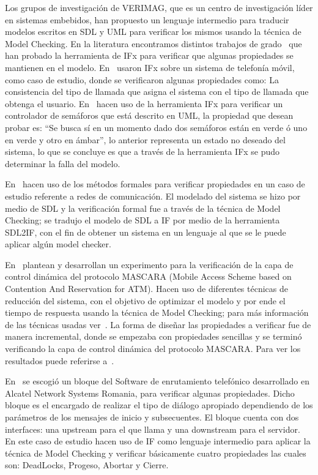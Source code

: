 Los grupos de investigaci\'on de VERIMAG, que es un centro de investigaci\'on l\'ider en sistemas embebidos, han propuesto un lenguaje intermedio para traducir modelos escritos en SDL y UML para verificar los mismos usando la t\'ecnica de Model Checking. En la literatura encontramos distintos trabajos de grado~\cite{BravoParra2006, Perez2006} que han probado la herramienta de IFx para verificar que algunas propiedades se mantienen en el modelo. En~\cite{BravoParra2006} usaron IFx sobre un sistema de telefon\'ia m\'ovil, como caso de estudio, donde se verificaron algunas propiedades como: La consistencia del tipo de llamada que asigna el sistema con el tipo de llamada que obtenga el usuario. En~\cite{Perez2006} hacen uso de la herramienta IFx para verificar un controlador de sem\'aforos que est\'a descrito en UML, la propiedad que desean probar es: “Se busca s\'i en un momento dado dos sem\'aforos est\'an en verde \'o uno en verde y otro en \'ambar”, lo anterior representa un  estado no deseado del sistema, lo que se concluye es que a trav\'es de la herramienta IFx se pudo determinar la falla del modelo.

En~\cite{Vaovic2005} hacen uso de los m\'etodos formales para verificar propiedades en un caso de estudio referente a redes de comunicaci\'on. El modelado del sistema se hizo por medio de SDL y la verificaci\'on formal fue a trav\'es de la t\'ecnica de Model Checking; se tradujo el modelo de SDL a IF por medio de la herramienta SDL2IF, con el fin de obtener un sistema en un lenguaje al que se le puede aplicar alg\'un model checker. 

En~\cite{Jia2001} plantean y desarrollan un experimento para la verificaci\'on de la capa de control din\'amica del protocolo MASCARA (Mobile Access Scheme based on Contention And Reservation for ATM). Hacen uso de diferentes t\'ecnicas de reducci\'on del sistema, con el objetivo de optimizar el modelo y por ende el tiempo de respuesta usando la t\'ecnica  de Model Checking; para m\'as informaci\'on de las t\'ecnicas usadas ver~\cite{Jia2001}. La forma de diseñar las propiedades a verificar fue de manera incremental, donde se empezaba con propiedades sencillas y se termin\'o verificando la capa de control din\'amica del protocolo MASCARA. Para ver los resultados puede referirse a~\cite{Jia2001}.

En~\cite{MariusMinea} se escogi\'o un bloque del  Software de enrutamiento telef\'onico desarrollado en Alcatel Network Systems Romania, para verificar algunas propiedades. Dicho bloque es el encargado de realizar el tipo de di\'alogo apropiado dependiendo de los par\'ametros de los mensajes de inicio y subsecuentes. El bloque cuenta con dos interfaces: una upstream para el que llama y una downstream para el servidor. En este caso de estudio hacen uso de IF como lenguaje intermedio para aplicar la t\'ecnica de Model Checking y verificar b\'asicamente cuatro propiedades las cuales son: DeadLocks, Progeso, Abortar y Cierre. 

